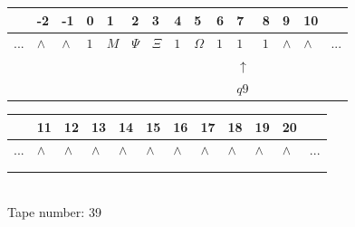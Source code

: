 \documentclass[11pt]{article}
\begin{document}
\begin{table}[H]
\centering
\begin{tabular}{lllllllllllllll}
 & -2 & -1 & 0 & 1 & 2 & 3 & 4 & 5 & 6 & 7 & 8 & 9 & 10 & \\
\hline
$...$ & \multicolumn{1}{|l|}{$\wedge$} & \multicolumn{1}{|l|}{$\wedge$} & \multicolumn{1}{|l|}{$1$} & \multicolumn{1}{|l|}{$M$} & \multicolumn{1}{|l|}{$\Psi$} & \multicolumn{1}{|l|}{$\Xi$} & \multicolumn{1}{|l|}{$1$} & \multicolumn{1}{|l|}{$\Omega$} & \multicolumn{1}{|l|}{$1$} & \multicolumn{1}{|l|}{$1$} & \multicolumn{1}{|l|}{$1$} & \multicolumn{1}{|l|}{$\wedge$} & \multicolumn{1}{|l|}{$\wedge$} & $...$\\
\hline
&  &  &  &  &  &  &  &  &  & $\uparrow$ &  &  &  &  \\
&  &  &  &  &  &  &  &  &  & $ q9 $ &  &  &  &  \\
\end{tabular}
\begin{tabular}{llllllllllll}
 & 11 & 12 & 13 & 14 & 15 & 16 & 17 & 18 & 19 & 20 & \\
\hline
$...$ & \multicolumn{1}{|l|}{$\wedge$} & \multicolumn{1}{|l|}{$\wedge$} & \multicolumn{1}{|l|}{$\wedge$} & \multicolumn{1}{|l|}{$\wedge$} & \multicolumn{1}{|l|}{$\wedge$} & \multicolumn{1}{|l|}{$\wedge$} & \multicolumn{1}{|l|}{$\wedge$} & \multicolumn{1}{|l|}{$\wedge$} & \multicolumn{1}{|l|}{$\wedge$} & \multicolumn{1}{|l|}{$\wedge$} & $...$\\
\hline
&  &  &  &  &  &  &  &  &  &  &  \\
&  &  &  &  &  &  &  &  &  &  &  \\
\end{tabular}
\\
Tape number: 39
\noindent\makebox[\linewidth]{\hdashrule{\textwidth}{1pt}{1pt}}\end{table}
\clearpage
\end{document}
